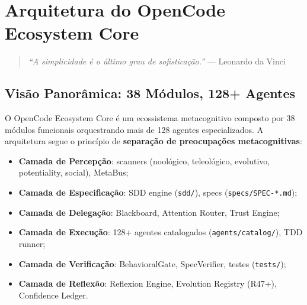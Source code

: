 \chapter{Arquitetura do OpenCode Ecosystem Core}

\begin{quote}
\textit{``A simplicidade é o último grau de sofisticação.''} --- Leonardo da Vinci
\end{quote}

\section{Visão Panorâmica: 38 Módulos, 128+ Agentes}

O OpenCode Ecosystem Core é um ecossistema metacognitivo composto por 38 módulos funcionais orquestrando mais de 128 agentes especializados. A arquitetura segue o princípio de \textbf{separação de preocupações metacognitivas}:

\begin{itemize}
    \item \textbf{Camada de Percepção}: scanners (noológico, teleológico, evolutivo, potentiality, social), MetaBus;
    \item \textbf{Camada de Especificação}: SDD engine (\texttt{sdd/}), specs (\texttt{specs/SPEC-*.md});
    \item \textbf{Camada de Delegação}: Blackboard, Attention Router, Trust Engine;
    \item \textbf{Camada de Execução}: 128+ agentes catalogados (\texttt{agents/catalog/}), TDD runner;
    \item \textbf{Camada de Verificação}: BehavioralGate, SpecVerifier, testes (\texttt{tests/});
    \item \textbf{Camada de Reflexão}: Reflexion Engine, Evolution Registry (R47+), Confidence Ledger.
\end{itemize}


